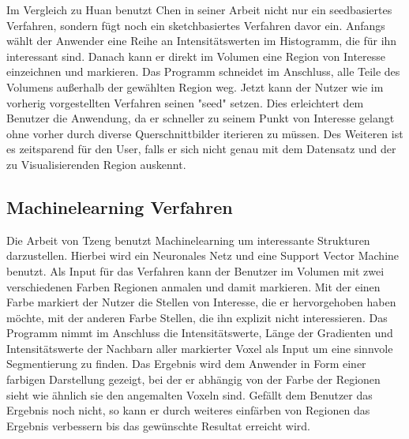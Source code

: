 Im Vergleich zu Huan \cite{huang2003rgvis} benutzt Chen  in seiner Arbeit \cite{chen2006sketch} nicht nur ein seedbasiertes Verfahren, sondern fügt noch ein sketchbasiertes Verfahren davor ein.
\newline
Anfangs wählt der Anwender eine Reihe an Intensitätswerten im Histogramm, die für ihn interessant sind. Danach kann er direkt im Volumen eine Region von Interesse einzeichnen und markieren. Das Programm schneidet im Anschluss, alle Teile des Volumens außerhalb der gewählten Region weg. Jetzt kann der Nutzer wie im vorherig vorgestellten Verfahren seinen "seed" setzen.
\newline
Dies erleichtert dem Benutzer die Anwendung, da er schneller zu seinem Punkt von Interesse gelangt ohne vorher durch diverse Querschnittbilder iterieren zu müssen. Des Weiteren ist es zeitsparend für den User, falls er sich nicht genau mit dem Datensatz und der zu Visualisierenden Region auskennt.





\subsection{Machinelearning Verfahren}

Die Arbeit von Tzeng \cite{tzeng2005intelligent} benutzt Machinelearning um interessante Strukturen darzustellen. Hierbei wird ein Neuronales Netz und eine Support Vector Machine benutzt.
\newline
Als Input für das Verfahren kann der Benutzer im Volumen mit zwei verschiedenen Farben Regionen anmalen und damit markieren. Mit der einen Farbe markiert der Nutzer die Stellen von Interesse, die er hervorgehoben haben möchte, mit der anderen Farbe Stellen, die ihn explizit nicht interessieren. Das Programm nimmt im Anschluss die Intensitätswerte, Länge der Gradienten und Intensitätswerte der Nachbarn aller markierter Voxel als Input um eine sinnvole Segmentierung zu finden. Das Ergebnis wird dem Anwender in Form einer farbigen Darstellung gezeigt, bei der er abhängig von der Farbe der Regionen sieht wie ähnlich sie den angemalten Voxeln sind. Gefällt dem Benutzer das Ergebnis noch nicht, so kann er durch weiteres einfärben von Regionen das Ergebnis verbessern bis das gewünschte Resultat erreicht wird.




